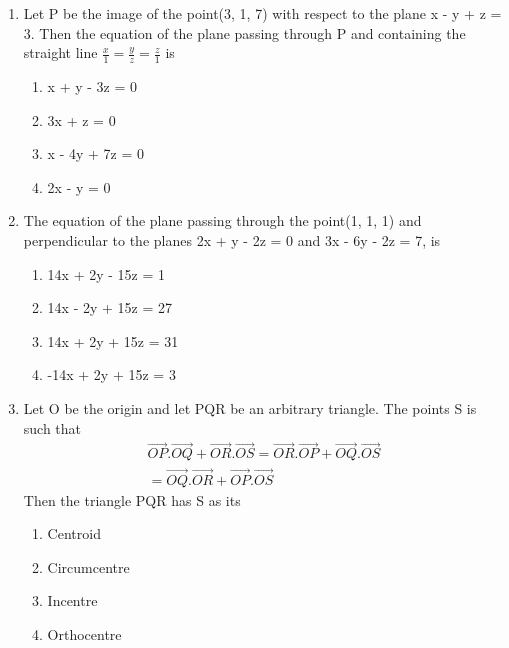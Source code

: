 \begin{enumerate}[label=\arabic*.,ref=\thesubsection.\theenumi]
\item Let P be the image of the point(3, 1, 7) with respect to the plane x - y + z = 3. Then the equation of the plane passing through P and containing the straight line $\frac{x}{1} = \frac{y}{z} = \frac{z}{1}$ is
\begin{enumerate}
\item x + y - 3z = 0
\item 3x + z = 0
\item x - 4y + 7z = 0
\item 2x - y = 0
\end{enumerate}

\item The equation of the plane passing through the point(1, 1, 1) and perpendicular to the planes 2x + y - 2z = 0 and 3x - 6y - 2z = 7, is
\begin{enumerate}
\item 14x + 2y - 15z = 1
\item 14x - 2y + 15z = 27
\item 14x + 2y + 15z = 31
\item -14x + 2y + 15z = 3
\end{enumerate}

\item Let O be the origin and let PQR be an arbitrary triangle. The points S is such that
\begin{align*}
\overrightarrow{OP}.\overrightarrow{OQ} + \overrightarrow{OR}.\overrightarrow{OS} = \overrightarrow{OR}.\overrightarrow{OP} + \overrightarrow{OQ}.\overrightarrow{OS}\\
 = \overrightarrow{OQ}.\overrightarrow{OR} + \overrightarrow{OP}.\overrightarrow{OS}
\end{align*}
Then the triangle PQR has S as its
\begin{enumerate}
\item Centroid
\item Circumcentre
\item Incentre
\item Orthocentre
\end{enumerate}


\end{enumerate}
